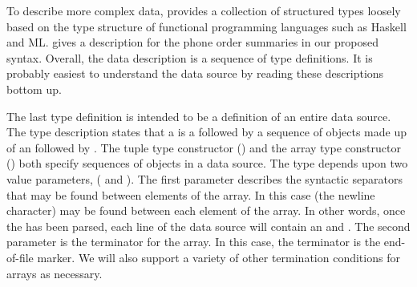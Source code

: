 \documentclass[11pt]{article}
\begin{document}
To describe more complex data, \datatype{} provides a collection of
structured types loosely based on the type structure of functional
programming languages such as Haskell and ML.  
 gives a \datatype{} description 
for the \dibbler{} phone order summaries in our
proposed syntax.  Overall, the data
description is a sequence of type definitions.
It is probably easiest to understand the data source by
reading these descriptions bottom up.

The last type definition  is intended to be
a definition of an entire \dibbler{} data source.  The
type description states that a  is a
 followed by a sequence of objects
made up of an  followed by .
The tuple type constructor () and the
array type constructor ()
both specify sequences of objects in a data source.
The  type depends upon two value parameters,
( and ).
The first parameter describes the syntactic separators 
that may be found between elements of the array.  In this
case  (the newline character) may be found between
each element of the array.  In other words, once 
the  has been parsed, each line
of the data source will contain an 
 and .  The second parameter
is the terminator for the array.  In this case,
the terminator is the end-of-file marker.  We will also
support a variety of other termination conditions for arrays as necessary.

\end{document}
